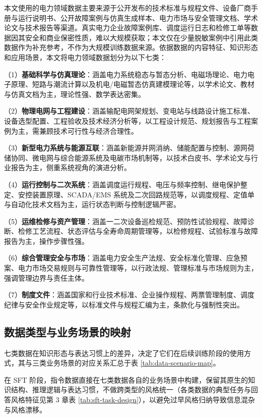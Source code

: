 \documentclass[fontset=fandol,type=master,campus=shenzhen,etitleauto=true]{hithesisbook}
\begin{document}
本文使用的电力领域数据主要来源于公开发布的技术标准与规程文件、设备厂商手册与运行说明书、公开故障案例与仿真生成样本、电力市场与安全管理文档、学术论文与技术报告等渠道。真实电力企业故障案例库、调度运行日志和检修工单等数据因其安全和商业保密性质，难以大规模获取；本文仅在少量脱敏案例中引用此类数据作为补充参考，不作为大规模训练数据来源。依据数据的内容特征、知识形态和应用场景，本文将电力领域数据划分为以下七类：

\noindent （1）\textbf{基础科学与仿真理论}：涵盖电力系统稳态与暂态分析、电磁场理论、电力电子原理、短路与潮流计算以及机电/电磁暂态仿真建模理论等，以学术论文、教材与仿真文档为主，理论性强、数学表达密集。

\noindent （2）\textbf{物理电网与工程建设}：涵盖输配电网架规划、变电站与线路设计施工标准、设备选型配置、工程验收及技术经济分析等，以工程设计规范、规划报告与工程案例为主，需兼顾技术可行性与经济合理性。

\noindent （3）\textbf{新型电力系统与能源互联}：涵盖新能源并网消纳、储能配置与控制、源网荷储协同、微电网与综合能源系统及电碳市场机制等，以技术白皮书、学术论文与行业报告为主，侧重系统视角的演进分析。

\noindent （4）\textbf{运行控制与二次系统}：涵盖调度运行规程、电压与频率控制、继电保护整定、安控装置原理、SCADA/EMS 系统及二次回路规范等，以调度规程、定值单与自动化技术文档为主，运行状态判断与控制逻辑严密。

\noindent （5）\textbf{运维检修与资产管理}：涵盖一二次设备巡检规范、预防性试验规程、故障诊断、检修工艺流程、状态评估与全寿命周期管理等，以检修规程、试验标准与故障报告为主，操作步骤性强。

\noindent （6）\textbf{综合管理安全与市场}：涵盖电力安全生产法规、安全标准化管理、应急预案、电力市场交易规则与可靠性管理等，以行政法规、管理标准与市场规则为主，强调管理边界与责任主体。

\noindent （7）\textbf{制度文件}：涵盖国家和行业技术标准、企业操作规程、两票管理制度、调度纪律与安全作业规定等，以标准文件与规程汇编为主，条款化与强制性突出。

\subsection{数据类型与业务场景的映射}\label{subsec:data-mapping}

七类数据在知识形态与表达习惯上的差异，决定了它们在后续训练阶段的使用方式，其与三类业务场景的对应关系汇总于表 \ref{tab:data-scenario-map}。

在 SFT 阶段，指令数据直接在七类数据各自的业务场景中构建，保留其原生的知识结构、推理逻辑与表达习惯，不做跨类型的风格统一（各类数据的典型任务与回答风格特征见第 3 章表 \ref{tab:sft-task-design}），以避免过早风格归纳导致信息混杂与风格漂移。
\end{document}
